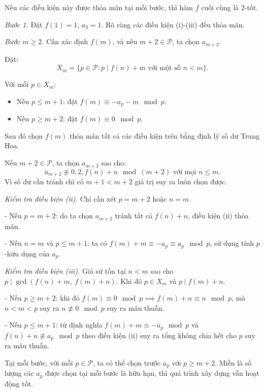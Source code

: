 \begin{problem}
\begin{soln}
    Nếu các điều kiện này được thỏa mãn tại mỗi bước, thì hàm \( f \) cuối cùng là 2-tốt.

    \textit{Bước 1.} Đặt \( f(1) = 1 \), \( a_3 = 1 \). Rõ ràng các điều kiện (i)-(iii) đều thỏa mãn.

    \textit{Bước \( m \ge 2 \).} Cần xác định \( f(m) \), và nếu \( m + 2 \in \mathcal{P} \), ta chọn \( a_{m+2} \).

    Đặt:
    \[
        X_m = \{ p \in \mathcal{P} : p \mid f(n) + m \text{ với một số } n < m \}.
    \]

    Với mỗi \( p \in X_m \):
    \begin{itemize}[topsep=0pt, partopsep=0pt, itemsep=0pt]
        \item Nếu \( p \le m + 1 \): đặt \( f(m) \equiv -a_p - m \mod p \).
        \item Nếu \( p \ge m + 2 \): đặt \( f(m) \equiv 0 \mod p \).
    \end{itemize}
    Sau đó chọn \( f(m) \) thỏa mãn tất cả các điều kiện trên bằng định lý số dư Trung Hoa.

    Nếu \( m + 2 \in \mathcal{P} \), ta chọn \( a_{m+2} \) sao cho:
    \[
        a_{m+2} \not\equiv 0, 2, f(n) + n \mod (m + 2) \text{ với mọi } n \le m.
    \]
    Vì số dư cần tránh chỉ có \( m + 1 < m + 2 \) giá trị suy ra luôn chọn được.

    \textit{Kiểm tra điều kiện (ii).} Chỉ cần xét \( p = m + 2 \) hoặc \( n = m \).

    - Nếu \( p = m + 2 \): do ta chọn \( a_{m+2} \) tránh tất cả \( f(n) + n \), điều kiện (ii) thỏa mãn.

    - Nếu \( n = m \) và \( p \le m + 1 \): ta có \( f(m) + m \equiv -a_p \equiv a_p \mod p \), sử dụng tính \( p \)-hữu dụng của \( a_p \).

    \textit{Kiểm tra điều kiện (iii).} Giả sử tồn tại \( n < m \) sao cho \( p \mid \gcd(f(n) + m,\ f(m) + n) \). Khi đó \( p \in X_m \) và \( p \mid f(m) + n \).

    - Nếu \( p \ge m + 2 \): khi đó \( f(m) \equiv 0 \mod p \implies f(m) + n \equiv n \mod p \), mà \( n < m < p \)
    suy ra \( n \not\equiv 0 \mod p \) suy ra mâu thuẫn.

    - Nếu \( p \le m + 1 \): từ định nghĩa \( f(m) + m \equiv -a_p \mod p \) và \( f(n) + n \not\equiv a_p \mod p \)
    theo điều kiện (ii) suy ra tổng không chia hết cho \( p \) suy ra mâu thuẫn.
\end{soln}

\begin{remark*}
    Tại mỗi bước, với mỗi \( p \in \mathcal{P} \), ta có thể chọn trước \( a_p \) với \( p \ge m + 2 \).
    Miễn là số lượng các \( a_p \) được chọn tại mỗi bước là hữu hạn, thì quá trình xây dựng vẫn hoạt động tốt.
\end{remark*}


\end{problem}
